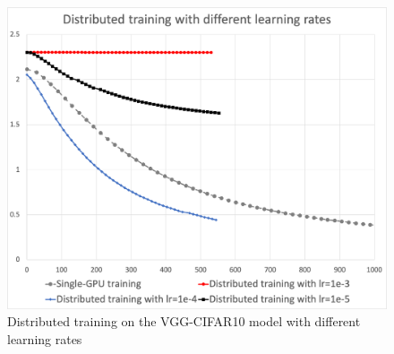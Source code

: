 


\begin{figure}%
  \centering
  \includegraphics[width=.8\textwidth]{lr-exp-graph}
  \caption{Distributed training on the VGG-CIFAR10 model with different learning rates}
  \label{fig:eval:cifar10}
\end{figure}

